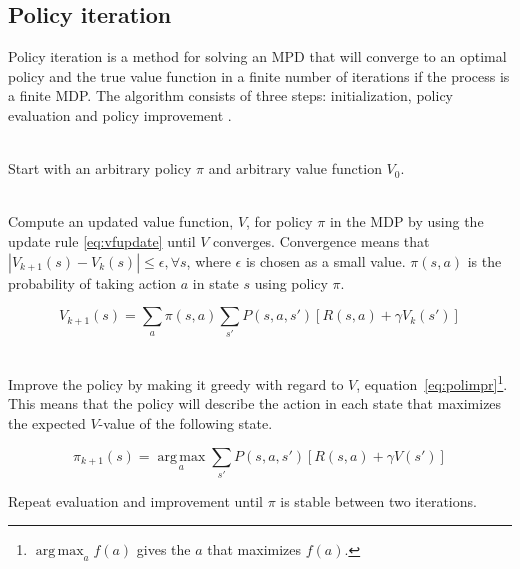 \subsection{Policy iteration}
\label{sec:pol_itr}

Policy iteration is a method for solving an MPD that will converge to an
optimal policy and the true value function in a finite number of iterations if
the process is a finite MDP. The algorithm consists of three steps:
initialization, policy evaluation and policy improvement
\parencite{barto1998reinforcement}.

\begin{description}
\item[Initialization] \hfill \\
    Start with an arbitrary policy $\pi$ and arbitrary value function $V_0$.

\item[Policy evaluation] \hfill \\
  Compute an updated value function, $V$, for policy $\pi$ in the MDP by using
  the update rule \eqref{eq:vfupdate} until $V$ converges. Convergence means that $|V_{k+1}(s) - V_{k}(s)| \leq \epsilon, \forall s$, where $\epsilon$ is chosen as a small value.   $\pi(s, a)$ is the
  probability of taking action $a$ in state $s$ using policy $\pi$.

\begin{equation} \label{eq:vfupdate}
  V_{k+1} (s) = \sum_a \pi(s, a) \sum_{s'} P(s, a, s') \left[ R(s, a) + \gamma V_k(s')  \right]
\end{equation}

\item[Policy improvement] \hfill \\
  Improve the policy by making it greedy with regard to $V$,
  equation~\eqref{eq:polimpr}\footnote{$\operatorname*{arg\,max} _a f(a)$ gives
  the $a$ that maximizes $f(a)$.}. This means that the policy will describe the
  action in each state that maximizes the expected $V$-value of the following
  state. 

\begin{equation} \label{eq:polimpr}
  \pi_{k+1} (s) = \operatorname*{arg\,max}_a \sum_{s'}P(s, a, s') \left[ R(s, a) + \gamma V(s') \right]
\end{equation}

\item Repeat evaluation and improvement until $\pi$ is stable between two iterations.
\end{description}


